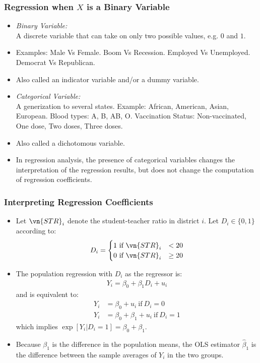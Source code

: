 

\begin{frame}
\frametitle{Regression when $X$ is a Binary Variable}
\begin{itemize}
\item \emph{Binary Variable:}\\
A discrete variable that can take on only two possible values, e.g. $0$ and $1$. 
\item Examples: Male Vs Female. Boom Vs Recession. Employed Vs Unemployed. Democrat Vs Republican. 
\item Also called an indicator variable and/or a dummy variable.
\item \emph{Categorical Variable:}\\
A generization to several states. Example: African, American, Asian, European. Blood types: A, B, AB, O. Vaccination Status: Non-vaccinated, One dose, Two doses, Three doses.
\item Also called a dichotomous variable. 
\item In regression analysis, the presence of categorical variables changes the interpretation of the regression results, but does not change the computation of regression coefficients. 
\end{itemize}
\end{frame}


\begin{frame}
\frametitle{Interpreting Regression Coefficients}
\begin{itemize}
\item Let $\vn{STR}_{i}$ denote the student-teacher ratio in district $i$. 
Let $D_{i} \in \{0,1\}$ according to:
\begin{align*}
D_{i} = 
  \begin{cases}
  1 ~\text{if}~  \vn{STR}_{i} & < 20 \\
  0 ~\text{if}~  \vn{STR}_{i} & \geq 20 
  \end{cases}
\end{align*}
\item The population regression with $D_{i}$ as the regressor is:
\begin{align*}
Y_{i} = \beta_{0} + \beta_{1} D_{i} + u_{i}
\end{align*}
and is equivalent to:
\begin{align*}
Y_{i} & = \beta_{0} + u_{i} ~\text{if}~ D_{i} = 0\\
Y_{i} & = \beta_{0} + \beta_{1} + u_{i} ~\text{if}~ D_{i} = 1
\end{align*}
which implies $\exp[Y_{i}|D_{i}=1]=\beta_{0} + \beta_{1}$.
\item Because $\beta_{1}$ is the difference in the population means, the OLS estimator $\hat{\beta}_{1}$ is the difference between the sample averages of $Y_{i}$ in the two groups. 
\end{itemize}
\end{frame}


